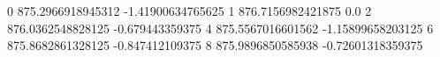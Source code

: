 0 875.2966918945312 -1.41900634765625
1 876.7156982421875 0.0
2 876.0362548828125 -0.679443359375
4 875.5567016601562 -1.15899658203125
6 875.8682861328125 -0.847412109375
8 875.9896850585938 -0.72601318359375
